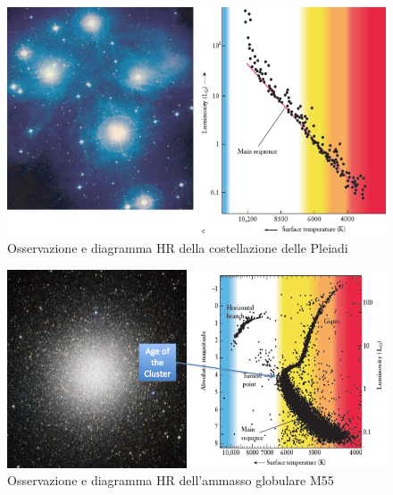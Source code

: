 \documentclass[a4paper,11pt]{article}
\begin{document}
\begin{figure}[h!!]
        \centering
        \includegraphics[width=13cm]{Osservazione e diagramma HR della costellazione delle Pleiadi.png}
        \caption{Osservazione e diagramma HR della costellazione delle Pleiadi}
        \label{fig:Osservazione e diagramma HR della costellazione delle Pleiadi}
    \end{figure}

    \begin{figure}[h!!]
        \centering
        \includegraphics[width=13cm]{Ammasso globulare.png}
        \caption{Osservazione e diagramma HR dell'ammasso globulare M55}
        \label{fig:Ammasso globulare}
    \end{figure}
    
\end{document}

